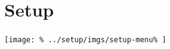 \documentclass[../main/main]{subfiles}
\begin{document}
\newpage
\chapter{Setup}
\texttt{[image: \%
  ../setup/imgs/setup-menu\%
]}
\end{document}
